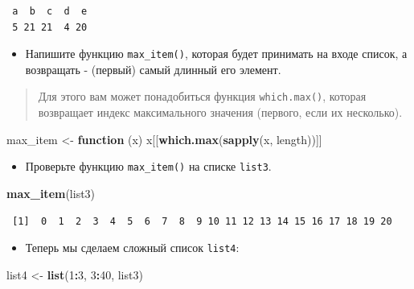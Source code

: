 \documentclass[
]{book}
\newenvironment{Shaded}{\begin{snugshade}}{\end{snugshade}}
\newcommand{\ControlFlowTok}[1]{\textcolor[rgb]{0.13,0.29,0.53}{\textbf{#1}}}
\newcommand{\DecValTok}[1]{\textcolor[rgb]{0.00,0.00,0.81}{#1}}
\newcommand{\KeywordTok}[1]{\textcolor[rgb]{0.13,0.29,0.53}{\textbf{#1}}}
\newcommand{\NormalTok}[1]{#1}
\newcommand{\OperatorTok}[1]{\textcolor[rgb]{0.81,0.36,0.00}{\textbf{#1}}}
\newcommand{\StringTok}[1]{\textcolor[rgb]{0.31,0.60,0.02}{#1}}
\providecommand{\tightlist}{%
  \setlength{\itemsep}{0pt}\setlength{\parskip}{0pt}}
\begin{document}
\begin{verbatim}
 a  b  c  d  e 
 5 21 21  4 20 
\end{verbatim}

\begin{itemize}
\tightlist
\item
  Напишите функцию \texttt{max\_item()}, которая будет принимать на входе список, а возвращать - (первый) самый длинный его элемент.
\end{itemize}

\begin{quote}
Для этого вам может понадобиться функция \texttt{which.max()}, которая возвращает индекс максимального значения (первого, если их несколько).
\end{quote}

\begin{Shaded}
\begin{Highlighting}[]
\NormalTok{max_item <-}\StringTok{ }\ControlFlowTok{function}\NormalTok{ (x) x[[}\KeywordTok{which.max}\NormalTok{(}\KeywordTok{sapply}\NormalTok{(x, length))]]}
\end{Highlighting}
\end{Shaded}

\begin{itemize}
\tightlist
\item
  Проверьте функцию \texttt{max\_item()} на списке \texttt{list3}.
\end{itemize}

\begin{Shaded}
\begin{Highlighting}[]
\KeywordTok{max_item}\NormalTok{(list3)}
\end{Highlighting}
\end{Shaded}

\begin{verbatim}
 [1]  0  1  2  3  4  5  6  7  8  9 10 11 12 13 14 15 16 17 18 19 20
\end{verbatim}

\begin{itemize}
\tightlist
\item
  Теперь мы сделаем сложный список \texttt{list4}:
\end{itemize}

\begin{Shaded}
\begin{Highlighting}[]
\NormalTok{list4 <-}\StringTok{ }\KeywordTok{list}\NormalTok{(}\DecValTok{1}\OperatorTok{:}\DecValTok{3}\NormalTok{, }\DecValTok{3}\OperatorTok{:}\DecValTok{40}\NormalTok{, list3)}
\end{Highlighting}
\end{Shaded}
\end{document}
